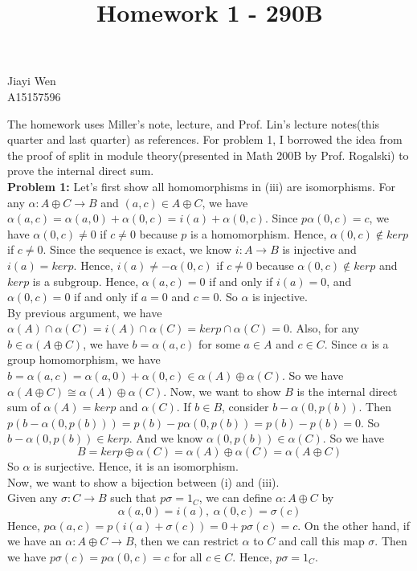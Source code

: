 \documentclass[12pt]{amsart}
\begin{document}
\title{Homework 1 - 290B}
\maketitle
\begin{center}
    Jiayi Wen\\
    A15157596
\end{center}
The homework uses Miller's note, lecture, and Prof. Lin's lecture notes(this quarter and last quarter) as references. For problem 1, I borrowed the idea from the proof of split in module theory(presented in Math 200B by Prof. Rogalski) to prove the internal direct sum. \\
\textbf{Problem 1:} Let's first show all homomorphisms in (iii) are isomorphisms. For any $\alpha:A\oplus C\to B $ and $(a,c)\in A\oplus C$, we have $\alpha(a,c)=\alpha(a,0)+\alpha(0,c)=i(a)+\alpha(0,c)$. Since $p\alpha(0,c)=c$, we have $\alpha(0,c)\neq0$ if $c\neq 0$ because $p$ is a homomorphism. Hence, $\alpha(0,c)\notin kerp$ if $c\neq0$. Since the sequence is exact, we know $i:A\to B$ is injective and $i(a)=kerp$. Hence, $i(a)\neq-\alpha(0,c)$ if $c\neq 0$ because $\alpha(0,c)\notin kerp$ and $kerp$ is a subgroup. Hence, $\alpha(a,c)=0$ if and only if $i(a)=0$, and $\alpha(0,c)=0$ if and only if $a=0$ and $c=0$. So $\alpha$ is injective.\\
By previous argument, we have $\alpha(A)\cap\alpha(C)=i(A)\cap \alpha(C)=kerp\cap \alpha(C)=0$. Also, for any $b\in \alpha(A\oplus C)$, we have $b=\alpha(a,c)$ for some $a\in A$ and $c\in C$. Since $\alpha$ is a group homomorphism, we have $b=\alpha(a,c)=\alpha(a,0)+\alpha(0,c)\in \alpha(A)\oplus\alpha(C)$. So we have $\alpha(A\oplus C)\cong \alpha(A)\oplus \alpha(C)$. Now, we want to show $B$ is the internal direct sum of $\alpha(A)=kerp$ and $\alpha(C)$. If $b\in B$, consider $b-\alpha(0,p (b))$. Then $p(b-\alpha(0,p (b)))=p(b)-p\alpha(0,p(b))=p(b)-p(b)=0$. So $b-\alpha(0,p(b))\in kerp$. And we know $\alpha(0,p(b))\in \alpha(C)$. So we have \[B=kerp\oplus \alpha(C)=\alpha(A)\oplus\alpha(C)=\alpha(A\oplus C)\]
So $\alpha$ is surjective. Hence, it is an isomorphism.\\
Now, we want to show a bijection between (i) and (iii).\\
Given any $\sigma:C\to B$ such that $p\sigma=1_C$, we can define $\alpha:A\oplus C$ by 
\[\alpha(a,0)=i(a),\ \alpha(0,c)=\sigma(c)\]
Hence, $p\alpha(a,c)=p(i(a)+\sigma(c))=0+p\sigma(c)=c$. On the other hand, if we have an $\alpha:A\oplus C\to B$, then we can restrict $\alpha$ to $C$ and call this map $\sigma$. Then we have $p\sigma(c)=p\alpha(0,c)=c$ for all $c\in C$. Hence, $p\sigma=1_C$.\\
\end{document}
